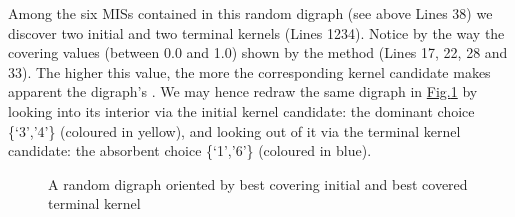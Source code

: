 \documentclass[a4paper,10pt,english]{sphinxhowto}
\let\sphinxpxdimen\pdfpxdimen\else\newdimen\sphinxpxdimen
\begin{document}
Among the six MISs contained in this random digraph (see above Lines 3\sphinxhyphen{}8) we discover two initial and two terminal kernels (Lines 12\sphinxhyphen{}34). Notice by the way the covering values (between 0.0 and 1.0) shown by the  method (Lines 17, 22, 28 and 33). The higher this value, the more the corresponding kernel candidate makes apparent the digraph’s . We may hence redraw the same digraph in \hyperref[\detokenize{tutorial:orientedlaterality}]{Fig.\@ \ref{\detokenize{tutorial:orientedlaterality}}} by looking into its interior via the  initial kernel candidate: the dominant choice \{‘3’,’4’\} (coloured in yellow), and looking out of it via the  terminal kernel candidate: the absorbent choice \{‘1’,’6’\} (coloured in blue).

\begin{sphinxVerbatim}[commandchars=\\\{\},numbers=left,firstnumber=1,stepnumber=1]
\PYGZbs{}
                  \PYG{p}{[} \PYG{p}{]}\PYGZbs{}
                  \PYG{p}{[} \PYG{p}{]}
\end{sphinxVerbatim}

\begin{figure}[htbp]
\centering
\capstart

\noindent\sphinxincludegraphics[width=300\sphinxpxdimen]{{orientedLaterality}.png}
\caption{A random digraph oriented by best covering initial and
best covered terminal kernel}\label{\detokenize{tutorial:orientedlaterality}}\end{figure}
\end{document}
